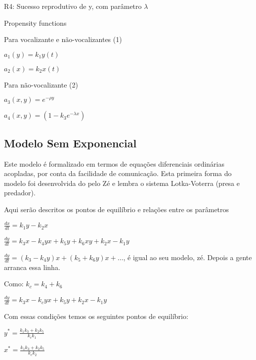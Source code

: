 R4: Sucesso reprodutivo de y, com parâmetro $\lambda$

\vspace{3 mm}
Propensity functions

\vspace{3 mm}
Para vocalizante e não-vocalizantes (1)

\vspace{3 mm}
$a_1(y)=k_1 y(t)$

\vspace{3 mm}
$a_2(x)=k_2 x(t)$

\vspace{3 mm}
Para não-vocalizante (2)

\vspace{3 mm}
$a_3(x,y)=e^{-\rho y}$

\vspace{3 mm}
$a_4(x,y)=(1-k_3 e^{-\lambda x})$

\subsection{Modelo Sem Exponencial}
Este modelo é formalizado em termos de equações diferenciais ordinárias acopladas, por conta da facilidade de comunicação. Esta primeira forma do modelo foi desenvolvida do pelo Zé e lembra o sistema Lotka-Voterra (presa e predador).

Aqui serão descritos os pontos de equilíbrio e relações entre os parâmetros

\vspace{3 mm}
$\frac{dx}{dt} = k_1 y - k_2 x$

\vspace{3 mm}
$\frac{dy}{dt} = k_3 x - k_4 y x + k_5 y + k_6 x y + k_2 x - k_1 y$

\vspace{3 mm}
$\frac{dy}{dt} = (k_3 - k_4 y)x + (k_5 + k_6 y)x + \ldots$, é igual ao seu modelo, zé. Depois a gente arranca essa linha.

\vspace{3 mm}
Como: $k_c= k_4+k_6$

\vspace{3 mm}
$\frac{dy}{dt} = k_3 x - k_c y x + k_5 y + k_2 x - k_1 y$

Com essas condições temos os seguintes pontos de equilíbrio:

$y^* = \frac{k_1 k_3 + k_2 k_5}{k_c k_1}$

\vspace{3 mm}
$x^* = \frac{k_1 k_3 + k_2 k_5}{k_c k_2}$

